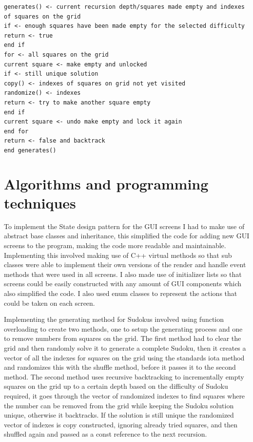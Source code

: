 \documentclass[]{final_report}
\begin{document}
\begin{verbatim}
generates() <- current recursion depth/squares made empty and indexes of squares on the grid
if <- enough squares have been made empty for the selected difficulty
return <- true
end if
for <- all squares on the grid
current square <- make empty and unlocked
if <- still unique solution
copy() <- indexes of squares on grid not yet visited
randomize() <- indexes
return <- try to make another square empty
end if
current square <- undo make empty and lock it again
end for
return <- false and backtrack
end generates()
\end{verbatim}

\section*{Algorithms and programming techniques}

To implement the State design pattern for the GUI screens I had to make use of abstract base classes and inheritance, this simplified the code for adding new GUI screens to the program, making the code more readable and maintainable. Implementing this involved making use of C++ virtual methods so that sub classes were able to implement their own versions of the render and handle event methods that were used in all screens. I also made use of initializer lists so that screens could be easily constructed with any amount of GUI components which also simplified the code. I also used enum classes to represent the actions that could be taken on each screen.

Implementing the generating method for Sudokus involved using function overloading to create two methods, one to setup the generating process and one to remove numbers from squares on the grid. The first method had to clear the grid and then randomly solve it to generate a complete Sudoku, then it creates a vector of all the indexes for squares on the grid using the standards iota method and randomizes this with the shuffle method, before it passes it to the second method. The second method uses recursive backtracking to incrementally empty squares on the grid up to a certain depth based on the difficulty of Sudoku required, it goes through the vector of randomized indexes to find squares where the number can be removed from the grid while keeping the Sudoku solution unique, otherwise it backtracks. If the solution is still unique the randomized vector of indexes is copy constructed, ignoring already tried squares, and then shuffled again and passed as a const reference to the next recursion.
\end{document}
